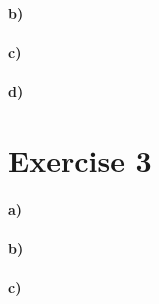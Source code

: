 \documentclass[12pt]{article}
\begin{document}
\paragraph{b)}

\paragraph{c)}

\paragraph{d)}

\section*{Exercise 3}

\paragraph{a)}

\paragraph{b)}

\paragraph{c)}
\end{document}
